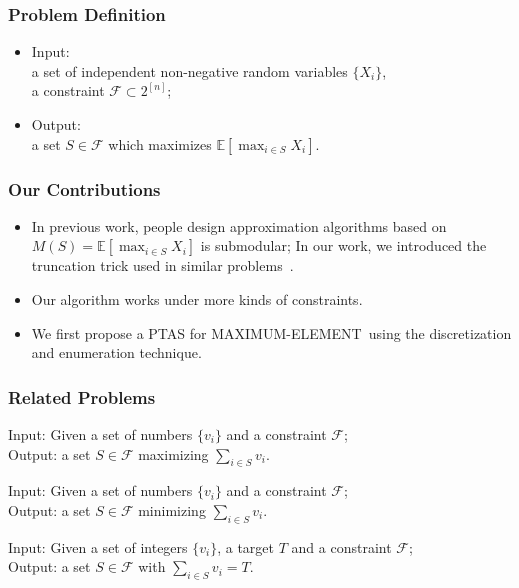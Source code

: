 \documentclass{beamer}
\newcommand{\calF}{{\mathcal F}}
\newcommand{\Exp}{{\mathbb{E}}}
\newcommand{\MM}{{\textsf{MAXIMUM-ELEMENT}}}
\begin{document}
\begin{frame}
    \frametitle{Problem Definition}
    \begin{problem}[\MM]
        \begin{itemize}
            \item Input:\\
                a set of independent non-negative random variables $\{X_i\}$,\\
                a constraint $\calF \subset 2^{[n]}$;
            \item Output:\\ a set $S\in \calF$ which maximizes $\Exp[\max_{i\in S} X_i]$.
        \end{itemize}
    \end{problem}
\end{frame}

\begin{frame}
\frametitle{Our Contributions}
\begin{itemize}
    \item In previous work, people design approximation algorithms based on $M(S) = \Exp[\max_{i\in S} X_i]$ is submodular; In our work, we introduced the truncation trick used in similar problems~\cite{kleinberg2000allocating,guha2009exceeding}. 
    \item Our algorithm works under more kinds of constraints.
    \item We first propose a PTAS for \MM\ using the discretization and enumeration technique.
\end{itemize}
\end{frame}


\begin{frame}
    \frametitle{Related Problems}
    \begin{problem}
        Input: Given a set of numbers $\{v_i\}$ and a constraint $\calF$;\\
        Output: a set $S\in \calF$ maximizing $\sum_{i\in S} v_i$.
    \end{problem}
    \begin{problem}
        Input: Given a set of numbers $\{v_i\}$ and a constraint $\calF$;\\
        Output: a set $S\in\calF$ minimizing $\sum_{i\in S} v_i$.
    \end{problem}
    \begin{problem}
        Input: Given a set of integers $\{v_i\}$, a target $T$ and a constraint $\calF$;\\
        Output: a set $S\in \calF$ with $\sum_{i\in S} v_i = T$.
    \end{problem}
\end{frame}
\end{document}
